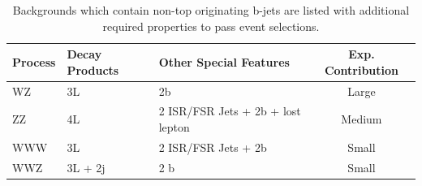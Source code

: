 	\begin{table}[hbt]
	\caption{\label{tab:bjet_bkg} Backgrounds which contain non-top originating b-jets are listed with additional required properties to pass event selections.}
	\begin{center}
	\begin{tabular}{l|ll|c}\hline\hline %
	Process & Decay Products & Other Special Features & Exp. Contribution\\
	\hline
	WZ & 3L & 2b  & Large\\
	ZZ & 4L & 2 ISR/FSR Jets + 2b + lost lepton & Medium\\
	WWW & 3L & 2 ISR/FSR Jets + 2b& Small\\
	WWZ & 3L + 2j & 2 b & Small\\
	\hline \hline
	\end{tabular}
	
	\end{center}
	\end{table}



		

			  
		
			
			
			
			
			